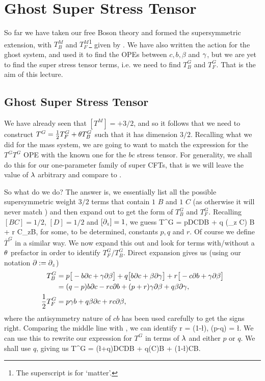 \chapter{Ghost Super Stress Tensor}

So far we have taken our free Boson theory and formed the supersymmetric extension, with $T_B^M$ and $T_F^M$\footnote{The superscript is for `matter'.} given by . We have also written the action for the ghost system, and used it to find the OPEs between $c, b, \beta$ and $\gamma$, but we are yet to find the super stress tensor terms, i.e. we need to find $T_B^G$ and $T_F^G$. That is the aim of this lecture. 

\section{Ghost Super Stress Tensor}

We have already seen that $[T^M]=+3/2$, and so it follows that we need to construct $T^G=\frac{1}{2}T_F^G+\theta T_B^G$ such that it has dimension $3/2$. Recalling what we did for the mass system, we are going to want to match the expression for the $T^GT^G$ OPE with the known one for the $bc$ stress tensor. For generality, we shall do this for our one-parameter family of super CFTs, that is we will leave the value of $\lambda$ arbitrary and compare to .

So what do we do? The answer is, we essentially list all the possible supersymmetric weight $3/2$ terms that contain $1$ $B$ and $1$ $C$ (as otherwise it will never match ) and then expand out to get the form of $T_B^G$ and $T_F^G$. Recalling $[BC]=1/2$, $[D]=1/2$ and $[\partial_z]=1$, we guess
\bse 
    T^G = pDCDB + q \big(\p_z C\big) B + r C\p_zB,
\ese 
for some, to be determined, constants $p,q$ and $r$. Of course we define $\overline{T}^G$ in a similar way. We now expand this out and look for terms with/without a $\theta$ prefactor in order to identify $T_F^G/T_B^G$. Direct expansion gives us (using our notation $\partial:=\partial_z$)
\begin{equation}
\label{eqn:TBTFGhostUndetermined}
    \begin{split}
        T_B^G & = p\big[-b\partial c + \gamma\partial\beta\big] + q\big[b\partial c + \beta\partial\gamma\big] + r\big[-c\partial b + \gamma\partial\beta\big] \\
        & = (q-p)b\partial c -rc\partial b + (p+r)\gamma\partial\beta + q\beta\partial\gamma, \\
        \frac{1}{2}T_F^G & = p\gamma b + q\beta\partial c + rc\partial\beta,
    \end{split}
\end{equation} 
where the antisymmetry nature of $cb$ has been used carefully to get the signs right. Comparing the middle line with , we can identify 
\be 
\label{eqn:rpqvalues}
    r = (1-\l), \qand (p-q) = \l. 
\ee 
We can use this to rewrite our expression for $T^G$ in terms of $\lambda$ and either $p$ or $q$. We shall use $q$, giving us 
\bse 
    T^G = (\l+q)DCDB + q\big(\p C\big)B + (1-\l)C\p B.
\ese 

